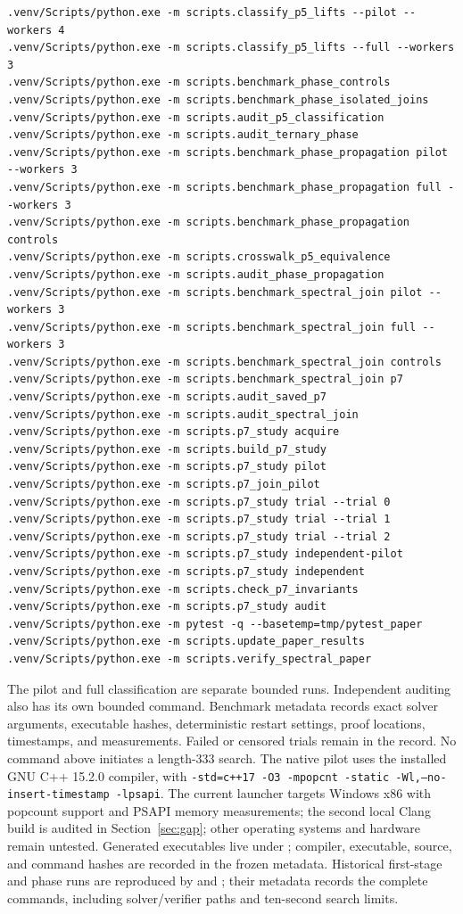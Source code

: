 \documentclass[11pt]{article}
\begin{document}
\begin{verbatim}
.venv/Scripts/python.exe -m scripts.classify_p5_lifts --pilot --workers 4
.venv/Scripts/python.exe -m scripts.classify_p5_lifts --full --workers 3
.venv/Scripts/python.exe -m scripts.benchmark_phase_controls
.venv/Scripts/python.exe -m scripts.benchmark_phase_isolated_joins
.venv/Scripts/python.exe -m scripts.audit_p5_classification
.venv/Scripts/python.exe -m scripts.audit_ternary_phase
.venv/Scripts/python.exe -m scripts.benchmark_phase_propagation pilot --workers 3
.venv/Scripts/python.exe -m scripts.benchmark_phase_propagation full --workers 3
.venv/Scripts/python.exe -m scripts.benchmark_phase_propagation controls
.venv/Scripts/python.exe -m scripts.crosswalk_p5_equivalence
.venv/Scripts/python.exe -m scripts.audit_phase_propagation
.venv/Scripts/python.exe -m scripts.benchmark_spectral_join pilot --workers 3
.venv/Scripts/python.exe -m scripts.benchmark_spectral_join full --workers 3
.venv/Scripts/python.exe -m scripts.benchmark_spectral_join controls
.venv/Scripts/python.exe -m scripts.benchmark_spectral_join p7
.venv/Scripts/python.exe -m scripts.audit_saved_p7
.venv/Scripts/python.exe -m scripts.audit_spectral_join
.venv/Scripts/python.exe -m scripts.p7_study acquire
.venv/Scripts/python.exe -m scripts.build_p7_study
.venv/Scripts/python.exe -m scripts.p7_study pilot
.venv/Scripts/python.exe -m scripts.p7_join_pilot
.venv/Scripts/python.exe -m scripts.p7_study trial --trial 0
.venv/Scripts/python.exe -m scripts.p7_study trial --trial 1
.venv/Scripts/python.exe -m scripts.p7_study trial --trial 2
.venv/Scripts/python.exe -m scripts.p7_study independent-pilot
.venv/Scripts/python.exe -m scripts.p7_study independent
.venv/Scripts/python.exe -m scripts.check_p7_invariants
.venv/Scripts/python.exe -m scripts.p7_study audit
.venv/Scripts/python.exe -m pytest -q --basetemp=tmp/pytest_paper
.venv/Scripts/python.exe -m scripts.update_paper_results
.venv/Scripts/python.exe -m scripts.verify_spectral_paper
\end{verbatim}
The pilot and full classification are separate bounded runs. Independent
auditing also has its own bounded command. Benchmark metadata records exact
solver arguments, executable hashes, deterministic restart settings, proof
locations, timestamps, and measurements. Failed or censored trials remain
in the record. No command above initiates a length-333 search.
The native pilot uses the installed GNU C++ 15.2.0 compiler, with
\texttt{-std=c++17 -O3 -mpopcnt -static -Wl,--no-insert-timestamp -lpsapi}.
The current launcher targets Windows x86 with popcount support and PSAPI
memory measurements; the second local Clang build is audited in
Section~\ref{sec:gap}; other operating systems and hardware remain untested.
Generated executables live under ; compiler, executable, source,
and command hashes are recorded in the frozen metadata.
Historical first-stage and phase runs are reproduced by
 and
; their metadata records the complete
commands, including solver/verifier paths and ten-second search limits.
\end{document}
